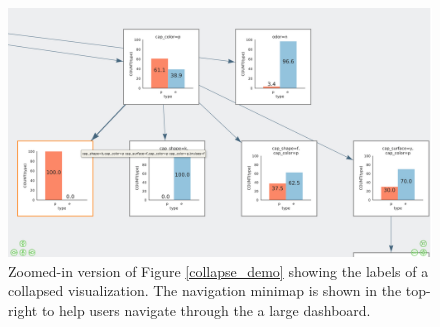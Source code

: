 \begin{figure}[ht!]
\label{hover_minimap}
\centering
\includegraphics[width=\linewidth]{figures/hoverLabel_minimap.jpg}
\caption{Zoomed-in version of Figure \ref{collapse_demo} showing the labels of a collapsed visualization. The navigation minimap is shown in the top-right to help users navigate through the a large dashboard.}
\end{figure}
